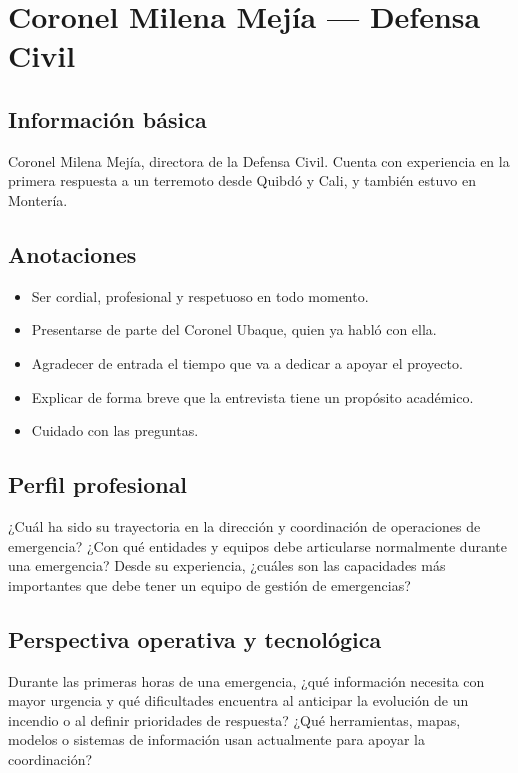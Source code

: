 \section{Coronel Milena Mejía --- Defensa Civil}

\subsection{Información básica}
Coronel Milena Mejía, directora de la Defensa Civil. Cuenta con experiencia en la primera respuesta a un terremoto desde Quibdó y Cali, y también estuvo en Montería.

\subsection{Anotaciones}
\begin{itemize}
  \item Ser cordial, profesional y respetuoso en todo momento.
  \item Presentarse de parte del Coronel Ubaque, quien ya habló con ella.
  \item Agradecer de entrada el tiempo que va a dedicar a apoyar el proyecto.
  \item Explicar de forma breve que la entrevista tiene un propósito académico.
  \item Cuidado con las preguntas.
\end{itemize}

\subsection{Perfil profesional}
\begin{enumerate}
  \pregunta ¿Cuál ha sido su trayectoria en la dirección y coordinación de operaciones de emergencia?
  \pregunta ¿Con qué entidades y equipos debe articularse normalmente durante una emergencia?
  \pregunta Desde su experiencia, ¿cuáles son las capacidades más importantes que debe tener un equipo de gestión de emergencias?
\end{enumerate}

\subsection{Perspectiva operativa y tecnológica}
\begin{enumerate}
  \pregunta Durante las primeras horas de una emergencia, ¿qué información necesita con mayor urgencia y qué dificultades encuentra al anticipar la evolución de un incendio o al definir prioridades de respuesta?
  \pregunta ¿Qué herramientas, mapas, modelos o sistemas de información usan actualmente para apoyar la coordinación?
\end{enumerate}


